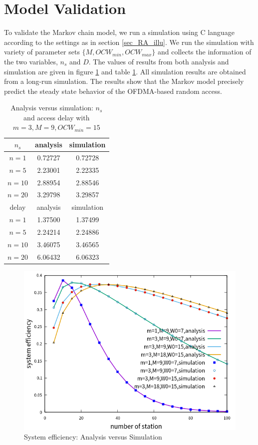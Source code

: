 \documentclass[journal]{IEEEtran}
\begin{document}
\section{Model Validation} 		\label{sec_model_val}
To validate the Markov chain model, we run a simulation using C language according to the settings as in section \ref{sec_RA_illu}. 
We run the simulation with variety of parameter sets $\lbrace M, OCW_{min}, OCW_{max}\rbrace$ and collects the information of the two variables, $n_s$ and $D$. 
The values of results from both analysis and simulation are given in figure \ref{validation} and table \ref{table_val}. 
All simulation results are obtained from a long-run simulation.
The results show that the Markov model precisely predict the steady state behavior of the OFDMA-based random access.
\begin{table}[!h]
\caption{Analysis versus simulation: $n_s$ and access delay with $m=3,M=9,OCW_{min} = 15$}
\label{table_val}
\begin{center}
\begin{tabular}{c|c|c}
\hline
$n_s$ 	& analysis 	& simulation \\
\hline
$n=1$ 	& 0.72727  	& 0.72728 \\
$n=5$ 	& 2.23001	& 2.22335 \\
$n=10$	& 2.88954	& 2.88546 \\
$n=20$	& 3.29798	& 3.29857 \\
\hline
delay	& analysis	& simulation \\
\hline
$n=1$ 	& 1.37500  	& 1.37499 \\
$n=5$ 	& 2.24214	& 2.24886 \\
$n=10$	& 3.46075	& 3.46565 \\
$n=20$	& 6.06432	& 6.06323 \\
\hline
\end{tabular}
\end{center}
\end{table}

\begin{figure}[!h]
\includegraphics[scale=0.54]{./figure/multiple_parameter.png}
\caption{System efficiency: Analysis versus Simulation}
\label{validation}
\end{figure}
\end{document}
